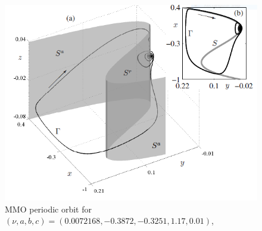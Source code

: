 \begin{figure}[h!]\centering
	\includegraphics[width= \textwidth]{Images/MMO3}
	\caption{MMO periodic orbit for $(\nu,a,b,c)= (0.0072168,-0.3872,-0.3251,1.17,0.01)$, \citep{MMO}}
	\label{fig: MMo5pic}
\end{figure}
